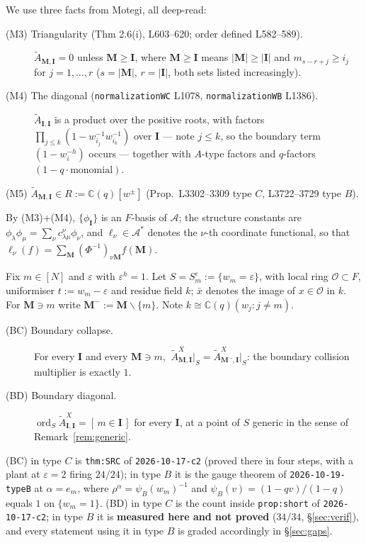 \documentclass[11pt]{article}
\theoremstyle{definition}
\newcommand{\At}{\widetilde{A}}
\newcommand{\bM}{\mathbf{M}}
\newcommand{\bI}{\mathbf{I}}
\newcommand{\sm}{\smallsetminus}
\newcommand{\ord}{\operatorname{ord}}
\begin{document}
We use three facts from Motegi, all deep-read:
\begin{description}
\item[(M3) Triangularity (Thm 2.6(i), L603--620; order defined L582--589).]
  $\At_{\bM,\bI}=0$ unless $\bM\ge\bI$, where $\bM\ge\bI$ means
  $|\bM|\ge|\bI|$ and $m_{s-r+j}\ge i_j$ for $j=1,\dots,r$
  ($s=|\bM|$, $r=|\bI|$, both sets listed increasingly).
\item[(M4) The diagonal (\texttt{normalizationWC} L1078, \texttt{normalizationWB}
  L1386).]  $\At_{\bI,\bI}$ is a product over the positive roots, with factors
  $\prod_{j\le k}(1-w_{i_j}^{-1}w_{i_k}^{-1})$ over $\bI$ --- note $j\le k$, so
  the boundary term $(1-w_{i}^{-h})$ occurs --- together with $A$-type factors
  and $q$-factors $(1-q\cdot\text{monomial})$.
\item[{(M5) $\At_{\bM,\bI}\in R:=\mathbb{C}(q)[w^{\pm}]$ (Prop.\ L3302--3309 type
  $C$, L3722--3729 type $B$).}]
\end{description}

By (M3)+(M4), $\{\phi_{\bI}\}$ is an $F$-basis of $\mathcal{A}$; the structure
constants are $\phi_\lambda\phi_\mu=\sum_\nu c^{\nu}_{\lambda\mu}\phi_\nu$, and
$\ell_\nu\in\mathcal{A}^{*}$ denotes the $\nu$-th coordinate functional, so that
$\ell_\nu(f)=\sum_{\bM}(\Phi^{-1})_{\nu\bM}f(\bM)$.

Fix $m\in[N]$ and $\varepsilon$ with $\varepsilon^{h}=1$.  Let
$S=S_m^{\varepsilon}:=\{w_m=\varepsilon\}$, with local ring
$\mathcal{O}\subset F$, uniformiser $t:=w_m-\varepsilon$ and residue field $k$;
$\bar x$ denotes the image of $x\in\mathcal{O}$ in $k$.  For $\bM\ni m$ write
$\bM^{-}:=\bM\sm\{m\}$.  Note $k\cong\mathbb{C}(q)(w_j:j\ne m)$.

\begin{description}
\item[(BC) Boundary collapse.]  For every $\bI$ and every $\bM\ni m$,
  $\ \At^{X}_{\bM,\bI}\big|_{S}=\At^{X}_{\bM^{-},\bI}\big|_{S}$: the boundary
  collision multiplier is exactly $1$.
\item[(BD) Boundary diagonal.]  $\ord_S\At^{X}_{\bI,\bI}=[\,m\in\bI\,]$ for
  every $\bI$, at a point of $S$ generic in the sense of
  Remark~\ref{rem:generic}.
\end{description}

\noindent
(BC) in type $C$ is \texttt{thm:SRC} of \texttt{2026-10-17-c2} (proved there in
four steps, with a plant at $\varepsilon=2$ firing $24/24$); in type $B$ it is
the gauge theorem of \texttt{2026-10-19-typeB} at $\alpha=e_m$, where
$\rho^{\alpha}=\psi_B(w_m)^{-1}$ and $\psi_B(v)=(1-qv)/(1-q)$ equals $1$ on
$\{w_m=1\}$.  (BD) in type $C$ is the count inside \texttt{prop:short} of
\texttt{2026-10-17-c2}; in type $B$ it is \textbf{measured here and not proved}
($34/34$, \S\ref{sec:verif}), and every statement using it in type $B$ is graded
accordingly in \S\ref{sec:gaps}.
\end{document}
